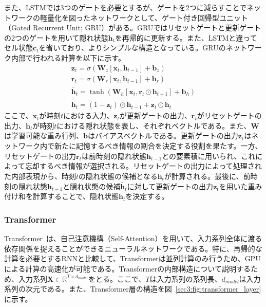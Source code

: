 \documentclass[12pt]{jarticle}
\numberwithin{equation}{section}    %
\numberwithin{figure}{section}      %
\numberwithin{table}{section}      %
\begin{document}
また、LSTMでは3つのゲートを必要とするが、ゲートを2つに減らすことでネットワークの軽量化を図ったネットワークとして、ゲート付き回帰型ユニット（Gated Recurrent Unit; GRU）\cite{cho2014learning}がある。GRUではリセットゲートと更新ゲートの2つのゲートを用いて隠れ状態$\bm{h}_{t}$を再帰的に更新する。また、LSTMと違ってセル状態$\bm{c}_{t}$を省いており、よりシンプルな構造となっている。GRUのネットワーク内部で行われる計算を以下に示す。
\begin{gather}
    \bm{z}_{t} = \sigma(\bm{W}_{z}[\bm{x}_{t}, \bm{h}_{t-1}] + \bm{b}_{z}) \\
    \bm{r}_{t} = \sigma(\bm{W}_{r}[\bm{x}_{t}, \bm{h}_{t-1}] + \bm{b}_{r}) \\
    \tilde{\bm{h}_{t}} = \tanh(\bm{W}_{h}[\bm{x}_{t}, \bm{r}_{t} \odot \bm{h}_{t-1}] + \bm{b}_{h}) \\
    \bm{h}_{t} = (1 - \bm{z}_{t}) \odot \bm{h}_{t-1} + \bm{z}_{t} \odot \tilde{\bm{h}_{t}}
\end{gather}
ここで、$\bm{x}_{t}$が時刻$t$における入力、$\bm{z}_{t}$が更新ゲートの出力、$\bm{r}_{t}$がリセットゲートの出力、$\bm{h}_{t}$が時刻$t$における隠れ状態を表し、それぞれベクトルである。また、$\bm{W}$は学習可能な重み行列、$\bm{b}$はバイアスベクトルである。更新ゲートの出力$\bm{z}_{t}$はネットワーク内で新たに記憶するべき情報の割合を決定する役割を果たす。一方、リセットゲートの出力$\bm{r}_{t}$は前時刻の隠れ状態$\bm{h}_{t-1}$との要素積に用いられ、これによって忘却するべき情報が選択される。リセットゲートの出力によって処理された内部表現から、時刻$t$の隠れ状態の候補となる$\tilde{\bm{h}_{t}}$が計算される。最後に、前時刻の隠れ状態$\bm{h}_{t-1}$と隠れ状態の候補$\tilde{\bm{h}_{t}}$に対して更新ゲートの出力$\bm{z}_{t}$を用いた重み付け和を計算することで、隠れ状態$\bm{h}_{t}$を決定する。

\subsubsection{Transformer}
Transformer~\cite{vaswani2017attention}は、自己注意機構（Self-Attention）を用いて、入力系列全体に渡る依存関係を捉えることができるニューラルネットワークである。特に、再帰的な計算を必要とするRNNと比較して、Transformerは並列計算のみ行うため、GPUによる計算の高速化が可能である。Transformerの内部構造について説明するため、入力系列$\bm{X} \in \mathbb{R}^{T \times d_{model}}$をとる。ここで、$T$は入力系列の系列長、$d_{model}$は入力系列の次元である。また、Transformer層の構造を図~\ref{sec3:fig:transformer_layer}に示す。
\end{document}
